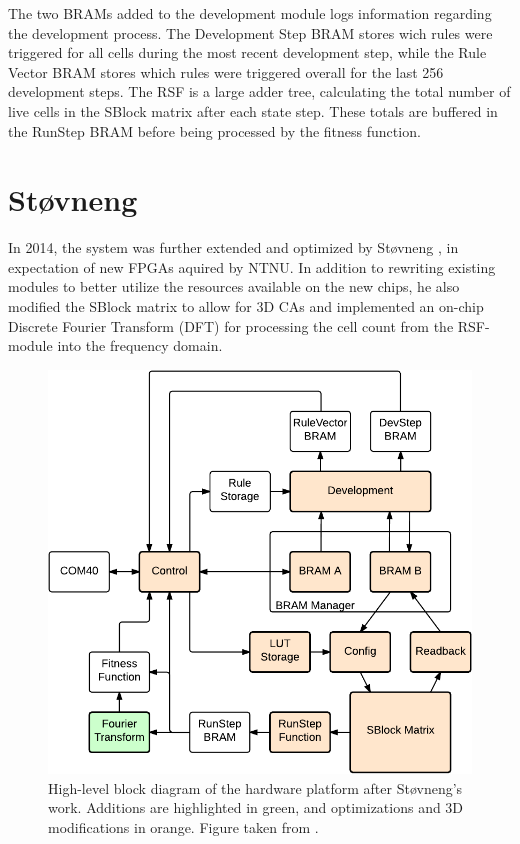 The two BRAMs added to the development module logs information regarding the
development process. The Development Step BRAM stores wich rules were triggered
for all cells during the most recent development step, while the Rule Vector
BRAM stores which rules were triggered overall for the last 256 development
steps. The RSF is a large adder tree, calculating the total number of live cells
in the SBlock matrix after each state step. These totals are buffered in the
RunStep BRAM before being processed by the fitness function.

\section{Støvneng}

In 2014, the system was further extended and optimized by Støvneng
\cite{Stovneng2014}, in expectation of new FPGAs aquired by NTNU. In addition to
rewriting existing modules to better utilize the resources available on the new
chips, he also modified the SBlock matrix to allow for 3D CAs and implemented an
on-chip Discrete Fourier Transform (DFT) for processing the cell count from the
RSF-module into the frequency domain.

\begin{figure}[!ht]
    \centering
    \includegraphics[width=0.8\linewidth]{fig/overview-stovneng}
    \caption[Støvneng's hardware design]{
        High-level block diagram of the hardware platform after Støvneng's work.
        Additions are highlighted in green, and optimizations and 3D modifications in orange.
        Figure taken from \cite{Lundal2015a}.
    }
    \label{fig:overview-stovneng}
\end{figure}

